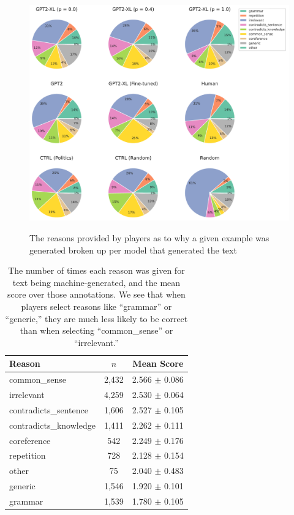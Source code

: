 \begin{figure}[tb]
    \centering
    \hbox{\hspace{6.0em} \includegraphics[scale=0.6]{figures/reasons_per_model.pdf}}
    \caption{The reasons provided by players as to why a given example was generated broken up per model that generated the text}
    \label{fig:reasons_per_model}
\end{figure}

\begin{table}[tb]
\small
\center
\begin{tabular}{lcc} \toprule
    {Reason} & {$n$} & {Mean Score}\\ \midrule
    {common\_sense} & {2,432} & {2.566 $\pm$ 0.086} \\
    {irrelevant} & {4,259} & {2.530 $\pm$ 0.064}  \\
    {contradicts\_sentence} & {1,606} & {2.527 $\pm$ 0.105}  \\ 
    {contradicts\_knowledge} & {1,411} & {2.262 $\pm$ 0.111}   \\
    {coreference} & {542} & {2.249 $\pm$ 0.176} \\
    {repetition} & {728} & {2.128 $\pm$ 0.154} \\
    {other} & {75} & {2.040 $\pm$ 0.483} \\
    {generic} & {1,546} & {1.920 $\pm$ 0.101} \\
    {grammar} & {1,539} & {1.780 $\pm$ 0.105} \\\bottomrule
\end{tabular}
\caption{
The number of times each reason was given for text being machine-generated, and the mean score over those annotations.
We see that when players select reasons like ``grammar'' or ``generic,'' they are much less likely to be correct than when selecting ``common\_sense'' or ``irrelevant.''}
\label{tab:reasons}
\end{table}


